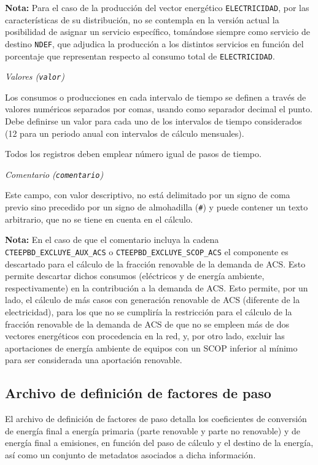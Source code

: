 \documentclass[10pt,notitlepage,oneside,a4paper]{article}
\begin{document}
\textbf{Nota:} Para el caso de la producción del vector energético \texttt{ELECTRICIDAD}, por las características de su distribución, no se contempla en la versión actual la posibilidad de asignar un servicio específico, tomándose siempre como servicio de destino \texttt{NDEF}, que adjudica la producción a los distintos servicios en función del porcentaje que representan respecto al consumo total de \texttt{ELECTRICIDAD}.

\textit{Valores (\texttt{valor})}

Los consumos o producciones en cada intervalo de tiempo se definen a través de valores numéricos separados por comas, usando como separador decimal el punto. Debe definirse un valor para cada uno de los intervalos de tiempo considerados (12 para un periodo anual con intervalos de cálculo mensuales).

Todos los registros deben emplear número igual de pasos de tiempo.

\textit{Comentario (\texttt{comentario})}

Este campo, con valor descriptivo, no está delimitado por un signo de coma previo sino precedido por un signo de almohadilla (\texttt{\#}) y puede contener un texto arbitrario, que no se tiene en cuenta en el cálculo.

\textbf{Nota:} En el caso de que el comentario incluya la cadena \texttt{CTEEPBD\_EXCLUYE\_AUX\_ACS} o \texttt{CTEEPBD\_EXCLUYE\_SCOP\_ACS} el componente es descartado para el cálculo de la fracción renovable de la demanda de ACS. Esto permite descartar dichos consumos (eléctricos y de energía ambiente, respectivamente) en la contribución a la demanda de ACS. Esto permite, por un lado, el cálculo de más casos con generación renovable de ACS (diferente de la electricidad), para los que no se cumpliría la restricción para el cálculo de la fracción renovable de la demanda de ACS de que no se empleen más de dos vectores energéticos con procedencia en la red, y, por otro lado, excluir las aportaciones de energía ambiente de equipos con un SCOP inferior al mínimo para ser considerada una aportación renovable.

\clearpage
\newpage
\subsection{Archivo de definición de factores de paso}\label{sec:formatofactorespaso}

El archivo de definición de factores de paso detalla los coeficientes de conversión de energía final a energía primaria (parte renovable  y parte no renovable) y de energía final a emisiones, en función del paso de cálculo y el destino de la energía, así como un conjunto de metadatos asociados a dicha información.
\end{document}
